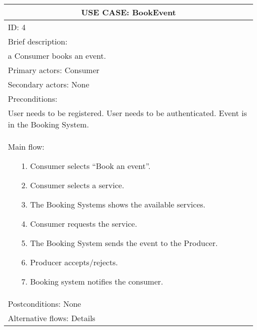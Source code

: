 \documentclass{article}
\begin{document}
\begin{table}[h!]
	\centering
	\begin{tabular}{|p{10cm}|}
		\hline
		\multicolumn{1}{|c|}{\textbf{USE CASE: BookEvent}}\\
		\hline
		ID: 4\\
		\hline
		Brief description:\\a Consumer books an event.\\
		\hline
		Primary actors: Consumer \\
		\hline
		Secondary actors: None \\
		\hline
		Preconditions:\\User needs to be registered. User needs to be authenticated. Event is in the Booking System.\\
		\hline
		Main flow:
		\vspace{-0.5\baselineskip}
		\begin{itemize}[leftmargin=1.2em]
			\item[1.] Consumer selects “Book an event”.
			\vspace{-0.5\baselineskip}
			\item[2.] Consumer selects a service.
			\vspace{-0.5\baselineskip}
			\item[3.] The Booking Systems shows the available services.
			\vspace{-0.5\baselineskip}
			\item[4.] Consumer requests the service.
			\vspace{-0.5\baselineskip}
			\item[5.] The Booking System sends the event to the Producer.
			\vspace{-0.5\baselineskip}
			\item[6.] Producer accepts/rejects.
			\vspace{-0.5\baselineskip}
			\item[7.] Booking system notifies the consumer.
		\end{itemize}
		\vspace{-1.5\baselineskip}
		\\
		\hline
		Postconditions: None \\
		\hline
		Alternative flows: Details \\
		\hline
	\end{tabular}
\end{table}
\end{document}
